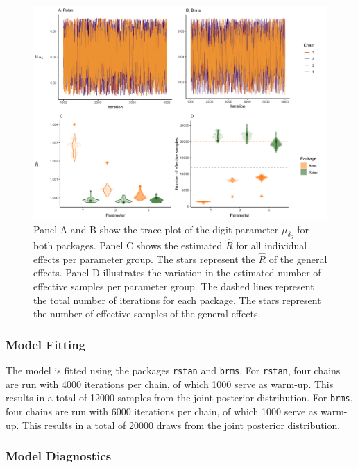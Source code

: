 \documentclass[
  english,
  doc,floatsintext]{apa6}
\begin{document}
\begin{figure}[H]

\includegraphics[width=1\linewidth]{Images/Fig8_traceplots3pnew_v2} \hfill{}

\caption{Panel A and B show the trace plot of the digit parameter $\mu_{\delta_{6}}$ for both packages. Panel C shows the estimated $\hat{R}$ for all individual effects per parameter group. The stars represent the $\hat{R}$ of the general effects. Panel D illustrates the variation in the estimated number of effective samples per parameter group. The dashed lines represent the total number of iterations for each package. The stars represent the number of effective samples of the general effects.}\label{fig:traceplots3p}
\end{figure}

\hypertarget{model-fitting}{%
\subsubsection{Model Fitting}\label{model-fitting}}

The model is fitted using the packages \texttt{rstan} and \texttt{brms}. For \texttt{rstan}, four chains are run with 4000 iterations per chain, of which 1000 serve as warm-up. This results in a total of 12000 samples from the joint posterior distribution. For \texttt{brms}, four chains are run with 6000 iterations per chain, of which 1000 serve as warm-up. This results in a total of 20000 draws from the joint posterior distribution.

\hypertarget{model-diagnostics}{%
\subsubsection{Model Diagnostics}\label{model-diagnostics}}
\end{document}
